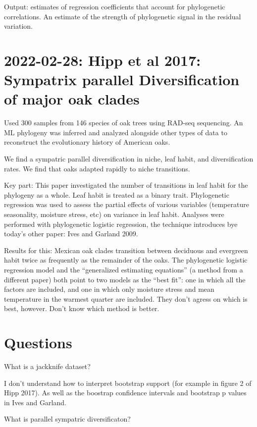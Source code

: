 \documentclass{article}
\begin{document}
Output: estimates of regression coefficients that account for phylogenetic
correlations. An estimate of the strength of phylogenetic signal in the residual
variation.




\section{2022-02-28: Hipp et al 2017: Sympatrix parallel Diversification of
  major oak clades}

Used 300 samples from 146 species of oak trees using RAD-seq sequencing. An ML
phylogeny was inferred and analyzed alongside other types of data to reconstruct
the evolutionary history of American oaks.

We find a sympatric parallel diversification in niche, leaf habit, and
diversification rates. We find that oaks adapted rapidly to niche transitions.

Key part: This paper investigated the number of transitions in leaf habit for
the phylogeny as a whole. Leaf habit is treated as a binary trait. Phylogenetic
regression was used to assess the partial effects of various variables
(temperature seasonality, moisture stress, etc) on variance in leaf habit.
Analyses were performed with phylogenetic logistic regression, the technique
introduces bye today's other paper: Ives and Garland 2009.

Results for this: Mexican oak clades transition between deciduous and evergreen
habit twice as frequently as the remainder of the oaks. The phylogenetic
logistic regression model and the ``generalized estimating equations'' (a method
from a different paper) both point to two models as the ``best fit'': one in
which all the factors are included, and one in which only moisture stress and
mean temperature in the warmest quarter are included. They don't agress on which
is best, however. Don't know which method is better.

\section{Questions} What is a jackknife dataset?

I don't understand how to interpret bootstrap support (for example in figure 2
of Hipp 2017). As well as the boostrap confidence intervals and bootstrap p
values in Ives and Garland. 

What is parallel sympatric diversificaton?
\end{document}

